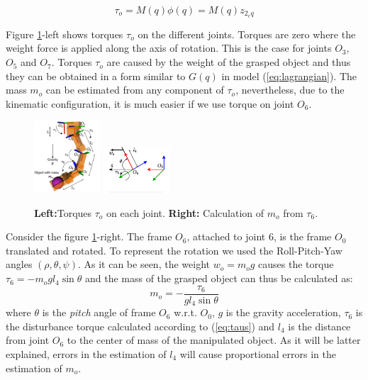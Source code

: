 \documentclass[conference,letterpaper]{ieeeconf}
\begin{document}
\begin{equation}
  \tau_o = M(q)\phi(q) = M(q)z_{2_eq}
  \label{eq:taus}
\end{equation}

Figure \ref{fig:frames_and_joints}-left shows torques $\tau_o$ on the different joints. Torques are zero where the weight force is applied along the axis of rotation. This is the case for joints $O_3$, $O_5$ and $O_7$. Torques $\tau_o$ are caused by the weight of the grasped object and thus they can be obtained in a form similar to $G(q)$ in model (\ref{eq:lagrangian}). The mass $m_o$ can be estimated from any component of $\tau_o$, nevertheless, due to the kinematic configuration, it is much easier if we use torque on joint $O_6$.
\begin{figure}
  \centering
  \includegraphics[width=0.22\textwidth]{Figures/fault_torques.pdf}
  \includegraphics[width=0.22\textwidth]{Figures/RPY.pdf}
  \caption{\textbf{Left:}Torques $\tau_o$ on each joint. \textbf{Right:} Calculation of $m_o$ from $\tau_6$.}
  \label{fig:frames_and_joints}
\end{figure}

Consider the figure \ref{fig:frames_and_joints}-right. The frame $O_6$, attached to joint 6, is the frame $O_0$ translated and rotated. To represent the rotation we used the Roll-Pitch-Yaw angles $(\rho, \theta, \psi)$. As it can be seen, the weight $w_o=m_o g$ causes the torque $\tau_6=-m_o g l_4 \sin\theta$ and the mass of the grasped object can thus be calculated as:
\begin{equation}
  m_o = -\frac{\tau_6}{gl_4\sin\theta}
  \label{eq:mass}
\end{equation}
where $\theta$ is the \textit{pitch} angle of frame $O_6$ w.r.t. $O_0$, $g$ is the gravity acceleration, $\tau_6$ is the disturbance torque calculated according to (\ref{eq:taus}) and $l_4$ is the distance from joint $O_6$ to the center of mass of the manipulated object. As it will be latter explained, errors in the estimation of $l_4$ will cause proportional errors in the estimation of $m_o$.
\end{document}
